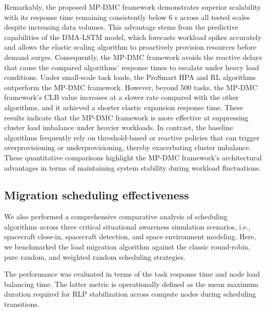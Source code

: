 \documentclass[twoside,twocolumn]{article}
\begin{document}
Remarkably, the proposed MP-DMC framework demonstrates superior scalability with its response time remaining consistently below 6 s across all tested scales despite increasing data volumes. This advantage stems from the predictive capabilities of the DMA-LSTM model, which forecasts workload spikes accurately and allows the elastic scaling algorithm to proactively provision resources before demand surges. Consequently, the MP-DMC framework avoids the reactive delays that cause the compared algorithms' response times to escalate under heavy load conditions. Under small-scale task loads, the ProSmart HPA and RL algorithms outperform the MP-DMC framework. However, beyond 500 tasks, the MP-DMC framework's CLB value increases at a slower rate compared with the other algorithms, and it achieved a shorter elastic expansion response time. These results indicate that the MP-DMC framework is more effective at suppressing cluster load imbalance under heavier workloads. In contrast, the baseline algorithms frequently rely on threshold-based or reactive policies that can trigger overprovisioning or underprovisioning, thereby exacerbating cluster imbalance. These quantitative comparisons highlight the MP-DMC framework's architectural advantages in terms of maintaining system stability during workload fluctuations.

\subsection{Migration scheduling effectiveness}

We also performed a comprehensive comparative analysis of scheduling algorithms across three critical situational awareness simulation scenarios, i.e., spacecraft close-in, spacecraft detection, and space environment modeling. Here, we benchmarked the load migration algorithm against the classic round-robin, pure random, and weighted random scheduling strategies.

The performance was evaluated in terms of the task response time and node load balancing time. The latter metric is operationally defined as the mean maximum duration required for RLP stabilization across compute nodes during scheduling transitions.
\end{document}

